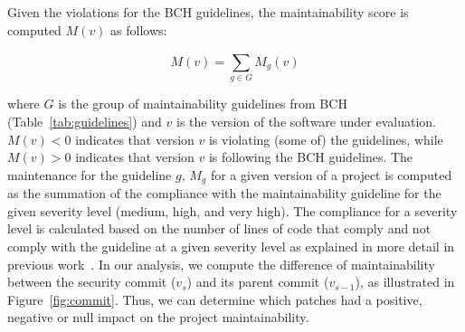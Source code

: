 \documentclass[10pt,conference]{IEEEtran}
\begin{document}
Given the violations for the BCH guidelines, the maintainability score is computed
$M(v)$ as follows:

\begin{equation}
    M(v) = \sum_{g \in G}^{} M_{g}(v)
\end{equation}

\noindent
where $G$ is the group of maintainability guidelines from BCH
(Table~\ref{tab:guidelines}) and $v$ is the version of the software under
evaluation. $M(v) < 0$ indicates that version $v$ is violating (some of) the
guidelines, while $M(v) > 0$ indicates that version $v$ is following
the BCH guidelines. The maintenance for the guideline $g$, $M_g$ for a given version
of a project is computed as the summation of the compliance with the 
maintainability guideline for the given severity level (medium, high, and very high).
The compliance for a severity level
is calculated based on the number of lines of code that comply and not comply
with the guideline at a given severity level as explained in more
detail in previous work~\cite{cruz2019energyoriented}. In our analysis, we compute 
the difference of maintainability between the security commit ($v_{s}$) and its parent 
commit ($v_{s-1}$), as illustrated in Figure~\ref{fig:commit}. Thus, we can determine 
which patches had a positive, negative or null impact on the project maintainability. 
%
%
%
%
\end{document}
